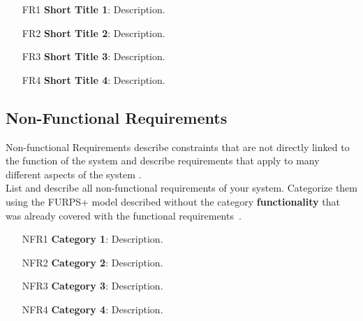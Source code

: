 \begin{itemize}[itemindent=-4pt, leftmargin=34pt, align=left]
    \item[FR1] \textbf{Short Title 1}: Description.
    \item[FR2] \textbf{Short Title 2}: Description.
    \item[FR3] \textbf{Short Title 3}: Description.
    \item[FR4] \textbf{Short Title 4}: Description.
\end{itemize}


\subsection*{Non-Functional Requirements}

\begin{tcolorbox}[breakable]
	Non-functional Requirements describe constraints that are not directly linked to the function of the system and describe requirements that apply to many different aspects of the system \cite{bruegge2013object}.
	\\
	List and describe all non-functional requirements of your system.
	Categorize them using the FURPS+ model described without the category \textbf{functionality} that was already covered with the functional requirements~\cite{bruegge2013object}. 
\end{tcolorbox}

\begin{itemize}[itemindent=-13pt, leftmargin=43pt, align=left]
    \item[NFR1] \textbf{Category 1}: Description.
    \item[NFR2] \textbf{Category 2}: Description.
    \item[NFR3] \textbf{Category 3}: Description.
    \item[NFR4] \textbf{Category 4}: Description.
\end{itemize}


